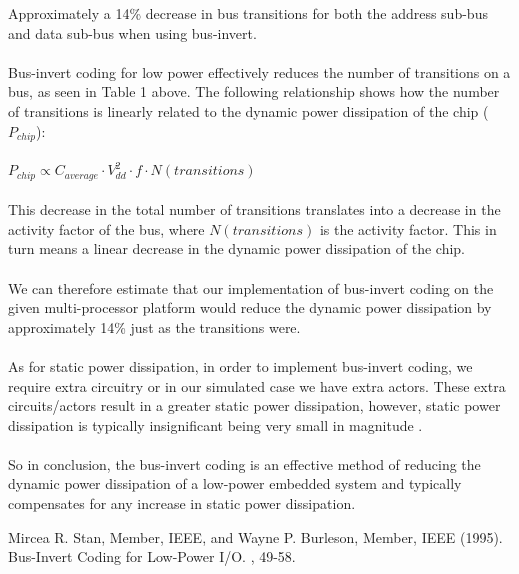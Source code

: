 \documentclass[12pt]{article} %
\begin{document}
Approximately a 14\% decrease in bus transitions for both the address sub-bus and data sub-bus when using bus-invert.
\\ \\
Bus-invert coding for low power effectively reduces the number of transitions on a bus, as seen in Table 1 above.
The following relationship shows how the number of transitions is linearly related to the dynamic power dissipation of the chip ($P_{chip}$):
\\ \\
$P_{chip} \propto C_{average} \cdot V_{dd}^2 \cdot f \cdot N(transitions)$ \cite{businvert:1995}
\\ \\
This decrease in the total number of transitions translates into a decrease in the activity factor of the bus, where $N(transitions)$ is the activity factor. This in turn means a linear decrease in the dynamic power dissipation of the chip.
\\ \\
We can therefore estimate that our implementation of bus-invert coding on the given multi-processor platform would reduce the dynamic power dissipation by approximately 14\% just as the transitions were.
\\ \\
As for static power dissipation, in order to implement bus-invert coding, we require extra circuitry or in our simulated case we have extra actors. These extra circuits/actors result in a greater static power dissipation, however, static power dissipation is typically insignificant being very small in magnitude \cite{businvert:1995}.
\\ \\
So in conclusion, the bus-invert coding is an effective method of reducing the dynamic power dissipation of a low-power embedded system and typically compensates for any increase in static power dissipation.



\begin{thebibliography}{99} %

Mircea R. Stan, Member, IEEE, and Wayne P. Burleson, Member, IEEE (1995).
\newblock Bus-Invert Coding for Low-Power I/O.
, 49-58.
 
\end{thebibliography}
\end{document}
